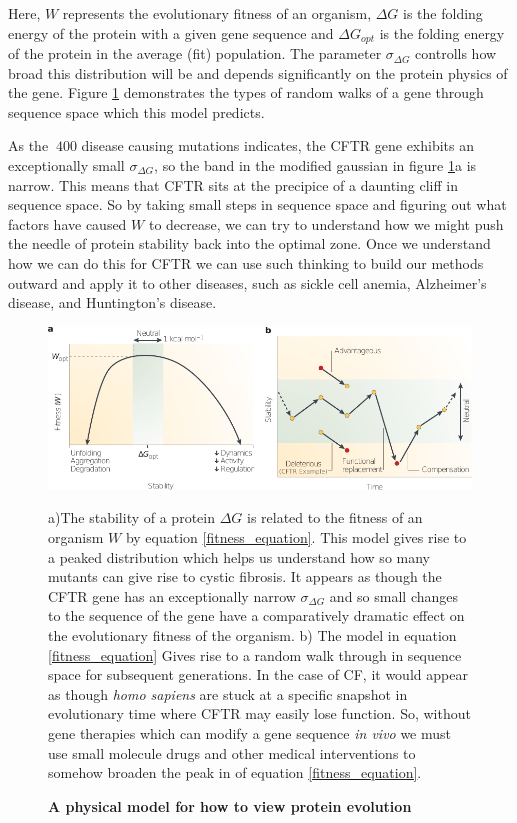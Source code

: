 Here, $W$ represents the evolutionary fitness of an organism, $\Delta G$ is the folding energy of the protein with a given gene sequence and $\Delta G_{opt}$ is the folding energy of the protein in the average (fit) population. The parameter $\sigma_{\Delta G}$ controlls how broad this distribution will be and depends significantly on the protein physics of the gene. Figure \ref{fitness_landscape_figure} demonstrates the types of random walks of a gene through sequence space which this model predicts. 

As the $\>400$ disease causing mutations indicates\cite{cftr2}, the CFTR gene exhibits an exceptionally small $\sigma_{\Delta G}$, so the band in the modified gaussian in figure \ref{fitness_landscape_figure}a is narrow. This means that CFTR sits at the precipice of a daunting cliff in sequence space.  So by taking small steps in sequence space and figuring out what factors have caused $W$ to decrease, we can try to understand how we might push the needle of protein stability back into the optimal zone. Once we understand how we can do this for CFTR we can use such thinking to build our methods outward and apply it to other diseases, such as sickle cell anemia, Alzheimer's disease, and Huntington's disease\cite{depristo2005}.

\begin{figure}
	\begin{center}
		\includegraphics[width=1.0\textwidth]{figures/fitness_landscape_fig.pdf}
	\end{center}
	\captionsetup{singlelinecheck = false, justification=raggedright}
	\caption[A physical model for how to view protein evolution] {\textbf{A physical model for how to view protein evolution}}{a)The stability of a protein $\Delta G$ is related to the fitness of an organism $W$ by equation \ref{fitness_equation}. This model gives rise to a peaked distribution which helps us understand how so many mutants can give rise to cystic fibrosis. It appears as though the CFTR gene has an exceptionally narrow $\sigma_{\Delta G}$ and so small changes to the sequence of the gene have a comparatively dramatic effect on the evolutionary fitness of the organism. b) The model in equation \ref{fitness_equation} Gives rise to a random walk through in sequence space for subsequent generations. In the case of CF, it would appear as though \textit{homo sapiens} are stuck at a specific snapshot in evolutionary time where CFTR may easily lose function. So, without gene therapies which can modify a gene sequence \textit {in vivo} we must use small molecule drugs and other medical interventions to somehow broaden the peak in of equation \ref{fitness_equation}.}
	\label{fitness_landscape_figure}
\end{figure}

